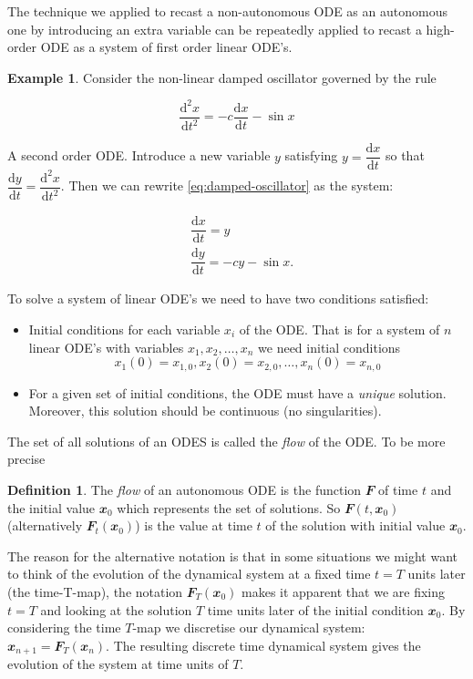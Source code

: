 \documentclass[
  a4paper,
  oneside,
  final]{krantz}
\providecommand{\tightlist}{%
  \setlength{\itemsep}{0pt}\setlength{\parskip}{0pt}}
\renewcommand{\d}{\mathrm{d}}
\renewcommand{\v}[1]{{\mathbfit{#1}}}
\newcommand{\der}[2]{\dfrac{\d #1}{\d #2}}
\newcommand{\dern}[3]{\dfrac{\d^{#3} #1}{\d #2 ^{#3}}}
\theoremstyle{definition}
\newtheorem{definition}{Definition}[chapter]
\theoremstyle{definition}
\newtheorem{example}{Example}[chapter]
\theoremstyle{definition}
\theoremstyle{definition}
\theoremstyle{remark}
\begin{document}
The technique we applied to recast a non-autonomous ODE as an autonomous one by introducing an extra variable can be repeatedly applied to recast a high-order ODE as a system of first order linear ODE's.

\begin{example}
Consider the non-linear damped oscillator governed by the rule

\begin{equation} 
\dern{x}{t}{2} = -c \der{x}{t} - \sin x \label{eq:damped-oscillator}
\end{equation}

A second order ODE. Introduce a new variable \(y\) satisfying \(y = \der{x}{t}\) so that \(\der{y}{t} = \dern{x}{t}{2}\).
Then we can rewrite \eqref{eq:damped-oscillator} as the system:

\begin{align*}
 &\der{x}{t} = y \\ 
 &\der{y}{t} = -cy - \sin x.
\end{align*}
\end{example}

To solve a system of linear ODE's we need to have two conditions satisfied:

\begin{itemize}
\tightlist
\item
  Initial conditions for each variable \(x_i\) of the ODE. That is for a system of \(n\) linear ODE's with variables \(x_1, x_2, \ldots, x_{n}\) we need initial conditions
  \[ x_1(0) = x_{1,0}, x_2(0) = x_{2,0}, \ldots, x_n(0) = x_{n,0}\]
\item
  For a given set of initial conditions, the ODE must have a \emph{unique} solution. Moreover, this solution should be continuous (no singularities).
\end{itemize}

The set of all solutions of an ODES is called the \emph{flow} of the ODE. To be more precise

\begin{definition}
The \emph{flow} of an autonomous ODE is the function \(\v{F}\) of time \(t\) and the initial value \(\v{x}_0\) which represents the set of solutions. So \(\v{F}(t, \v{x}_0)\) (alternatively \(\v{F}_{t}(\v{x}_0)\)) is the value at time \(t\) of the solution with initial value \(\v{x}_0\).
\end{definition}

The reason for the alternative notation is that in some situations we might want to think of the evolution of the dynamical system at a fixed time \(t=T\) units later (the time-T-map), the notation \(\v{F}_{T}(\v{x}_0)\) makes it apparent that we are fixing \(t=T\) and looking at the solution \(T\) time units later of the initial condition \(\v{x}_0\). By considering the time \(T\)-map we discretise our dynamical system: \(\v{x}_{n+1} = \v{F}_{T}(\v{x}_{n})\). The resulting discrete time dynamical system gives the evolution of the system at time units of \(T\).
\end{document}
